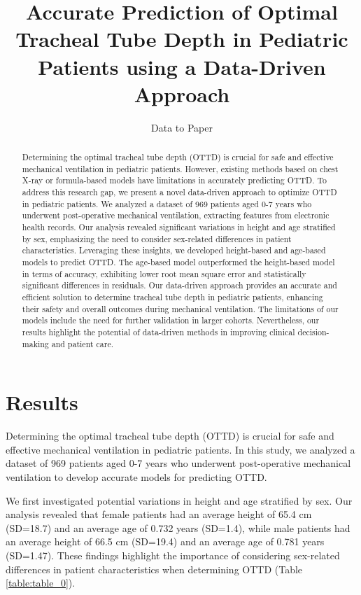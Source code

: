 \documentclass[11pt]{article}
\title{Accurate Prediction of Optimal Tracheal Tube Depth in Pediatric Patients using a Data-Driven Approach}
\author{Data to Paper}
\begin{document}
\maketitle
\begin{abstract}
Determining the optimal tracheal tube depth (OTTD) is crucial for safe and effective mechanical ventilation in pediatric patients. However, existing methods based on chest X-ray or formula-based models have limitations in accurately predicting OTTD. To address this research gap, we present a novel data-driven approach to optimize OTTD in pediatric patients. We analyzed a dataset of 969 patients aged 0-7 years who underwent post-operative mechanical ventilation, extracting features from electronic health records. Our analysis revealed significant variations in height and age stratified by sex, emphasizing the need to consider sex-related differences in patient characteristics. Leveraging these insights, we developed height-based and age-based models to predict OTTD. The age-based model outperformed the height-based model in terms of accuracy, exhibiting lower root mean square error and statistically significant differences in residuals. Our data-driven approach provides an accurate and efficient solution to determine tracheal tube depth in pediatric patients, enhancing their safety and overall outcomes during mechanical ventilation. The limitations of our models include the need for further validation in larger cohorts. Nevertheless, our results highlight the potential of data-driven methods in improving clinical decision-making and patient care.
\end{abstract}
\section*{Results}

Determining the optimal tracheal tube depth (OTTD) is crucial for safe and effective mechanical ventilation in pediatric patients. In this study, we analyzed a dataset of 969 patients aged 0-7 years who underwent post-operative mechanical ventilation to develop accurate models for predicting OTTD.

We first investigated potential variations in height and age stratified by sex. Our analysis revealed that female patients had an average height of 65.4 cm (SD=18.7) and an average age of 0.732 years (SD=1.4), while male patients had an average height of 66.5 cm (SD=19.4) and an average age of 0.781 years (SD=1.47). These findings highlight the importance of considering sex-related differences in patient characteristics when determining OTTD (Table {}\ref{table:table_0}).
\end{document}
